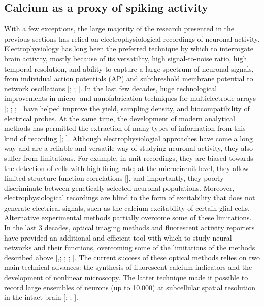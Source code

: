 \subsection{Calcium as a proxy of spiking activity}
\label{chap1:sec:1:subsec3:calcium_proxy_spikes}
With a few exceptions, the large majority of the research presented in the previous sections has relied on electrophysiological recordings of neuronal activity.  
Electrophysiology has long been the preferred technique by which to interrogate brain activity, mostly because of its versatility, high signal-to-noise ratio, high temporal resolution, and ability to capture a large spectrum of neuronal signals, from individual action potentials (AP) and subthreshold membrane potential to network oscillations [\cite{buzsaki2012}; \cite{margrie2003}; \cite{hubel1959}].
In the last few decades, huge technological improvements in micro- and nanofabrication techniques for multielectrode arrays [\cite{bareketkeren2012}; \cite{spira2013}; \cite{viventi2012}; \cite{jun2017}] have helped improve the yield, sampling density, and biocompatibility of electrical probes.
At the same time, the development of modern analytical methods has permitted the extraction of many types of information from this kind of recording [\cite{agarwal2014}; \cite{sheinidelson2017}]. 
Although electrophysiologial approaches have come a long way and are a reliable and versatile way of studying neuronal activity, they also suffer from limitations. 
For example, in unit recordings, they are biased towards the detection of cells with high firing rate; at the microcircuit level, they allow limited structure-function correlations [\cite{dombeck2010}], and importantly, they poorly discriminate between genetically selected neuronal populations. 
Moreover, electrophysiological recordings are blind to the form of excitability that does not generate electrical signals, such as the calcium excitability of certain glial cells.
Alternative experimental methods partially overcome some of these limitations. 
In the last 3 decades, optical imaging methods and fluorescent activity reporters have provided an additional and efficient tool with which to study neural networks and their functions, overcoming some of the limitations of the methods described above [\cite{ohki2005},\cite{shoham1999}; \cite{grienberger2012}; \cite{bovetti2014}; \cite{yang2017}]. 
The current success of these optical methods relies on two main technical advances: the synthesis of fluorescent calcium indicators and the development of nonlinear microscopy. 
The latter technique made it possible to record large ensembles of neurons (up to 10.000) at subcellular spatial resolution in the intact brain [\cite{bovetti2014}; \cite{yang2017}; \cite{svoboda2006}].

